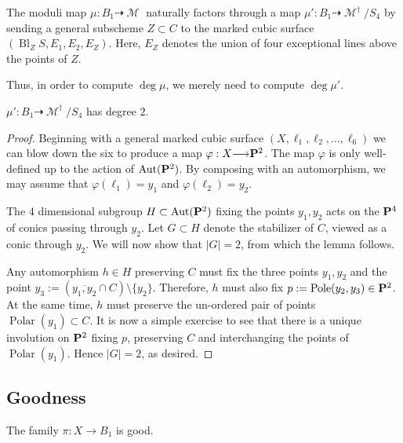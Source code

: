 \documentclass[12pt,reqno]{amsart}
\DeclareMathOperator{\Bl}{Bl}
\DeclareMathOperator{\Polar}{Polar}
\DeclareMathOperator{\Pole}{Pole}
\DeclareMathOperator{\M}{\mathcal{M}}
\renewcommand{\to}{{\longrightarrow}}
\numberwithin{equation}{section}
\begin{document}
The moduli map $\mu: B_{1} \dashrightarrow \M$ naturally factors
through a map $\mu': B_1 \dashrightarrow \M^{\dagger}/S_{4}$ by
sending a general subscheme $Z \subset C$ to the marked cubic surface
$(\Bl_{Z}S, E_1, E_2, E_{Z})$. Here, $E_Z$ denotes the union of four
exceptional lines above the points of $Z$.


Thus, in order to compute $\deg \mu$, we merely need to compute
$\deg \mu'$.

  \begin{lemma}
    \label{lemma:degreemudaggerB1}
    $\mu': B_1 \dashrightarrow \M^{\dagger}/S_{4}$ has degree $2$.
  \end{lemma}

  \begin{proof}
    Beginning with a general marked cubic surface
    $(X, \ell_{1}, \ell_2, \dots, \ell_{6})$ we can blow down the six
    to produce a map $\varphi: X \to \P^2$. The map $\varphi$ is only
    well-defined up to the action of $\Aut(\P^{2})$.  By composing
    with an automorphism, we may assume that
    $\varphi(\ell_{1}) = y_{1}$ and $\varphi(\ell_{2}) = y_{2}$.

    The $4$ dimensional subgroup $H \subset \Aut(\P^{2})$ fixing the
    points $y_{1}, y_{2}$ acts on the $\P^{4}$ of conics passing
    through $y_{2}$. Let $G \subset H$ denote the stabilizer of $C$,
    viewed as a conic through $y_{2}$.  We will now show that $|G|=2$,
    from which the lemma follows.

    Any automorphism $h \in H$ preserving $C$ must fix the three
    points $y_{1},y_{2}$ and the point
    $y_{3}:= (\overline{y_{1},y_{2}} \cap C) \setminus \{y_{2}\}.$
    Therefore, $h$ must also fix $p := \Pole(y_{2},y_{3}) \in \P^{2}$.
    At the same time, $h$ must preserve the un-ordered pair of points
    $\Polar(y_{1}) \subset C$. It is now a simple exercise to see that
    there is a unique involution on $\P^{2}$ fixing $p$, preserving
    $C$ and interchanging the points of $\Polar(y_{1})$. Hence
    $|G|=2$, as desired.
  \end{proof}




\subsection{Goodness}
\label{sec:goodness1}

\begin{proposition}
  \label{prop:B1good}
  The family $\pi: X \to B_1$ is good.
\end{proposition}
\end{document}
